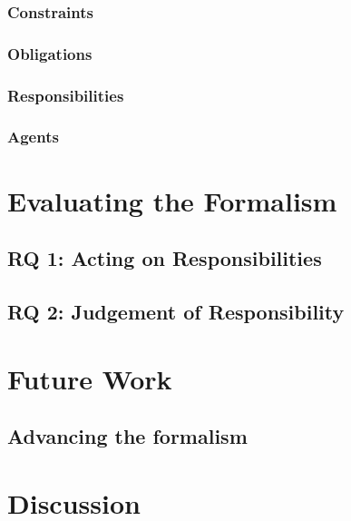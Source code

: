 

\subsubsection{Constraints}  %

\subsubsection{Obligations}  %

\subsubsection{Responsibilities}  %

\subsubsection{Agents}  %


\section{Evaluating the Formalism}

\subsection{RQ 1: Acting on Responsibilities}

\subsection{RQ 2: Judgement of Responsibility}



\section{Future Work}

\subsection{Advancing the formalism}


\section{Discussion}






